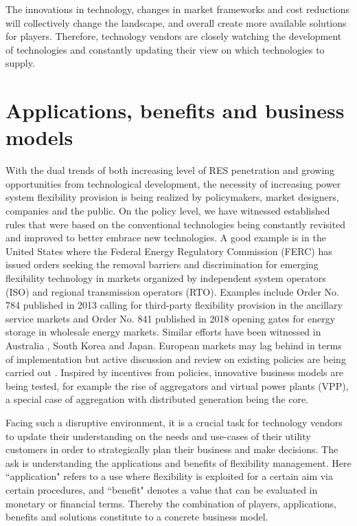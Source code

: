 The innovations in technology, changes in market frameworks and cost reductions will collectively change the landscape, and overall create more available solutions for players. Therefore, technology vendors are closely watching the development of technologies and constantly updating their view on which technologies to supply. 

\section{Applications, benefits and business models}
With the dual trends of both increasing level of RES penetration and growing opportunities from technological development, the necessity of increasing power system flexibility provision is being realized by policymakers, market designers, companies and the public. On the policy level, we have witnessed established rules that were based on the conventional technologies being constantly revisited and improved to better embrace new technologies. A good example is in the United States where the Federal Energy Regulatory Commission (FERC) has issued orders seeking the removal barriers and discrimination for emerging flexibility technology in markets organized by independent system operators (ISO) and regional transmission operators (RTO). Examples include Order No. 784 \cite{FERC784} published in 2013 calling for third-party flexibility provision in the ancillary service markets and Order No. 841 \cite{FERC841} published in 2018 opening gates for energy storage in wholesale energy markets. Similar efforts have been witnessed in Australia \cite{Brown2015,AEMO_DR}, South Korea and Japan\cite{Lipari2017}. European markets may lag behind in terms of implementation but active discussion and review on existing policies are being carried out \cite{ENTSO-E2015,EuropeanCommission2017,Poganietz2017}. Inspired by incentives from policies, innovative business models are being tested, for example the rise of aggregators and virtual power plants (VPP), a special case of aggregation with distributed generation being the core. 

Facing such a disruptive environment, it is a crucial task for technology vendors to update their understanding on the needs and use-cases of their utility customers in order to strategically plan their business and make decisions. The ask is understanding the applications and benefits of flexibility management.  Here ``application" refers to a use where flexibility is exploited for a certain aim via certain procedures, and ``benefit" denotes a value that can be evaluated in monetary or financial terms. Thereby the combination of players, applications, benefits and solutions constitute to a concrete business model.

